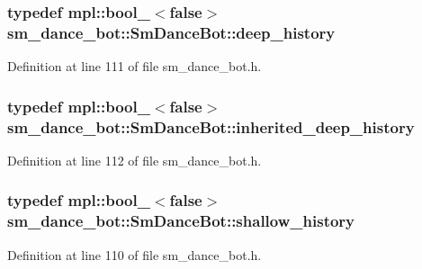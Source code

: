 \subsubsection[{\texorpdfstring{deep\+\_\+history}{deep_history}}]{\setlength{\rightskip}{0pt plus 5cm}typedef mpl\+::bool\+\_\+$<$false$>$ {\bf sm\+\_\+dance\+\_\+bot\+::\+Sm\+Dance\+Bot\+::deep\+\_\+history}}\hypertarget{structsm__dance__bot_1_1SmDanceBot_abd58ec4a2b50a45da304a5f0b9c44706}{}\label{structsm__dance__bot_1_1SmDanceBot_abd58ec4a2b50a45da304a5f0b9c44706}


Definition at line 111 of file sm\+\_\+dance\+\_\+bot.\+h.

\subsubsection[{\texorpdfstring{inherited\+\_\+deep\+\_\+history}{inherited_deep_history}}]{\setlength{\rightskip}{0pt plus 5cm}typedef mpl\+::bool\+\_\+$<$false$>$ {\bf sm\+\_\+dance\+\_\+bot\+::\+Sm\+Dance\+Bot\+::inherited\+\_\+deep\+\_\+history}}\hypertarget{structsm__dance__bot_1_1SmDanceBot_a9bc29171f1a5e3cfd09824a06f6a8058}{}\label{structsm__dance__bot_1_1SmDanceBot_a9bc29171f1a5e3cfd09824a06f6a8058}


Definition at line 112 of file sm\+\_\+dance\+\_\+bot.\+h.

\subsubsection[{\texorpdfstring{shallow\+\_\+history}{shallow_history}}]{\setlength{\rightskip}{0pt plus 5cm}typedef mpl\+::bool\+\_\+$<$false$>$ {\bf sm\+\_\+dance\+\_\+bot\+::\+Sm\+Dance\+Bot\+::shallow\+\_\+history}}\hypertarget{structsm__dance__bot_1_1SmDanceBot_a780b2408077887cc9c888ed0a95bff68}{}\label{structsm__dance__bot_1_1SmDanceBot_a780b2408077887cc9c888ed0a95bff68}


Definition at line 110 of file sm\+\_\+dance\+\_\+bot.\+h.



